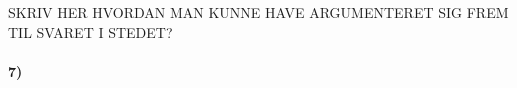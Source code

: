 \documentclass[../main.tex]{subfiles}
\begin{document}



SKRIV HER HVORDAN MAN KUNNE HAVE ARGUMENTERET SIG FREM TIL SVARET I STEDET?





\paragraph[7) Teori for spin-$S$ partikel med $S > 1$]{\textbf{7)}}



\end{document}
